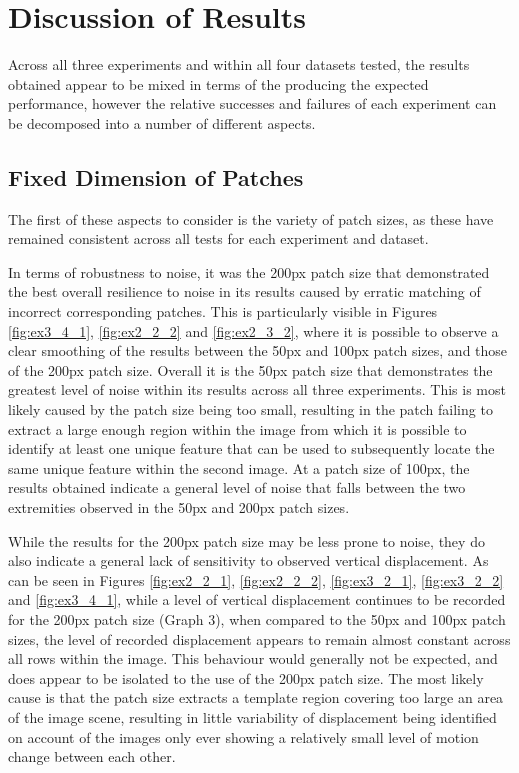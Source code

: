 \clearpage
\section{Discussion of Results}

Across all three experiments and within all four datasets tested, the results obtained appear to be mixed in terms of the producing the expected performance, however the relative successes and failures of each experiment can be decomposed into a number of different aspects.

\subsection{Fixed Dimension of Patches}

The first of these aspects to consider is the variety of patch sizes, as these have remained consistent across all tests for each experiment and dataset. 

In terms of robustness to noise, it was the 200px patch size that demonstrated the best overall resilience to noise in its results caused by erratic matching of incorrect corresponding patches. This is particularly visible in Figures \ref{fig:ex3_4_1}, \ref{fig:ex2_2_2} and \ref{fig:ex2_3_2}, where it is possible to observe a clear smoothing of the results between the 50px and 100px patch sizes, and those of the 200px patch size. Overall it is the 50px patch size that demonstrates the greatest level of noise within its results across all three experiments. This is most likely caused by the patch size being too small, resulting in the patch failing to extract a large enough region within the image from which it is possible to identify at least one unique feature that can be used to subsequently locate the same unique feature within the second image. At a patch size of 100px, the results obtained indicate a general level of noise that falls between the two extremities observed in the 50px and 200px patch sizes. 

While the results for the 200px patch size may be less prone to noise, they do also indicate a general lack of sensitivity to observed vertical displacement. As can be seen in Figures \ref{fig:ex2_2_1}, \ref{fig:ex2_2_2}, \ref{fig:ex3_2_1}, \ref{fig:ex3_2_2} and \ref{fig:ex3_4_1}, while a level of vertical displacement continues to be recorded for the 200px patch size (Graph 3), when compared to the 50px and 100px patch sizes, the level of recorded displacement appears to remain almost constant across all rows within the image. This behaviour would generally not be expected, and does appear to be isolated to the use of the 200px patch size. The most likely cause is that the patch size extracts a template region covering too large an area of the image scene, resulting in little variability of displacement being identified on account of the images only ever showing a relatively small level of motion change between each other. 


